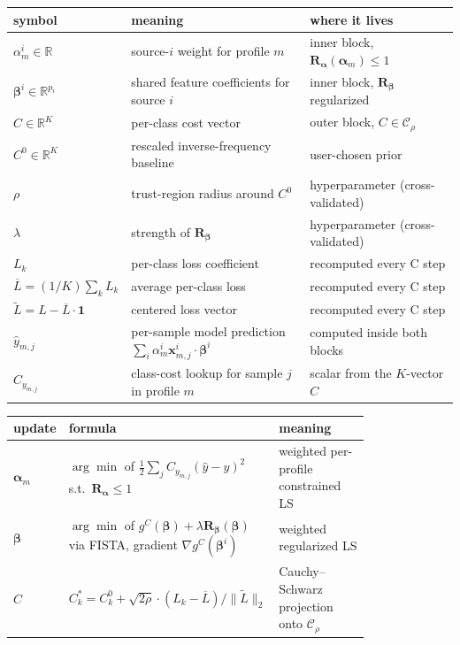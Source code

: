 \documentclass[11pt,a4paper]{article}
\begin{document}
\begin{center}
\small
\begin{tabular}{lll}
\toprule
\textbf{symbol} & \textbf{meaning} & \textbf{where it lives} \\
\midrule
$\alpha^i_m \in \mathbb{R}$ & source-$i$ weight for profile $m$ & inner block, $\mathbf{R}_{\boldsymbol{\alpha}}(\boldsymbol{\alpha}_m) \leq 1$ \\
$\boldsymbol{\beta}^i \in \mathbb{R}^{p_i}$ & shared feature coefficients for source $i$ & inner block, $\mathbf{R}_{\boldsymbol{\beta}}$ regularized \\
$C \in \mathbb{R}^K$ & per-class cost vector & outer block, $C \in \mathcal{C}_\rho$ \\
$C^0 \in \mathbb{R}^K$ & rescaled inverse-frequency baseline & user-chosen prior \\
$\rho$ & trust-region radius around $C^0$ & hyperparameter (cross-validated) \\
$\lambda$ & strength of $\mathbf{R}_{\boldsymbol{\beta}}$ & hyperparameter (cross-validated) \\
$L_k$ & per-class loss coefficient & recomputed every C step \\
$\overline{L} = (1/K) \sum_k L_k$ & average per-class loss & recomputed every C step \\
$\widetilde{L} = L - \overline{L} \cdot \mathbf{1}$ & centered loss vector & recomputed every C step \\
$\hat{y}_{m,j}$ & per-sample model prediction $\sum_i \alpha^i_m \mathbf{x}^i_{m,j} \cdot \boldsymbol{\beta}^i$ & computed inside both blocks \\
$C_{y_{m,j}}$ & class-cost lookup for sample $j$ in profile $m$ & scalar from the $K$-vector $C$ \\
\bottomrule
\end{tabular}
\end{center}

\bigskip

\begin{center}
\small
\begin{tabular}{lp{0.50\linewidth}p{0.30\linewidth}}
\toprule
\textbf{update} & \textbf{formula} & \textbf{meaning} \\
\midrule
$\boldsymbol{\alpha}_m$ & $\arg\min$ of $\frac{1}{2}\sum_j C_{y_{m,j}}(\hat{y}-y)^2$ s.t.\ $\mathbf{R}_{\boldsymbol{\alpha}} \leq 1$ & weighted per-profile constrained LS \\
$\boldsymbol{\beta}$ & $\arg\min$ of $g^C(\boldsymbol{\beta}) + \lambda \mathbf{R}_{\boldsymbol{\beta}}(\boldsymbol{\beta})$ via FISTA, gradient $\nabla g^C(\boldsymbol{\beta}^i)$ & weighted regularized LS \\
$C$ & $C_k^* = C_k^0 + \sqrt{2\rho}\cdot(L_k - \overline{L}) / \|\widetilde{L}\|_2$ & Cauchy--Schwarz projection onto $\mathcal{C}_\rho$ \\
\bottomrule
\end{tabular}
\end{center}
\end{document}

